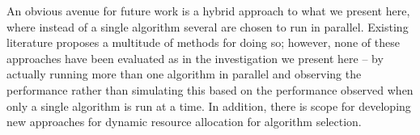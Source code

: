 An obvious avenue for future work is a hybrid approach to what we present here, where instead of a single algorithm several are chosen to run in parallel. Existing literature proposes a multitude of methods for doing so; however, none of these approaches have been evaluated as in the investigation we present here -- by actually running more than one algorithm in parallel and observing the performance rather than simulating this based on the performance observed when only a single algorithm is run at a time. In addition, there is scope for developing new approaches for dynamic resource allocation for algorithm selection.
\nocite{*} %
